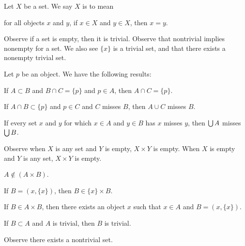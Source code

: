 \documentclass{article}
\begin{document}
\begin{definition}\label{zfmisc1:defn10:trivial}
Let $X$ be a set. We say $X$ is  to mean
\begin{defn}
\item for all objects $x$ and $y$, if $x\in X$ and $y\in X$, then $x=y$.
\end{defn}
\end{definition}

Observe if a set is empty, then it is trivial. Observe that nontrivial
implies nonempty for a set. We also see $\{x\}$ is a trivial set, and
that there exists a nonempty trivial set.

Let $p$ be an object. We have the following results:
\begin{thm}
\item\label{zfmisc1:124} If $A\subset B$ and $B\cap C=\{p\}$ and $p\in A$,
  then $A\cap C=\{p\}$.
\item\label{zfmisc1:125} If $A\cap B\subset\{p\}$ and $p\in C$ and $C$
  misses $B$, then $A\cup C$ misses $B$.
\item\label{zfmisc1:126} If every set $x$ and $y$ for which $x\in A$ and
  $y\in B$ has $x$ misses $y$, then $\bigcup A$ misses $\bigcup B$. 
\end{thm}

Observe when $X$ is any set and $Y$ is empty, $X\times Y$ is empty.
When $X$ is empty and $Y$ is any set, $X\times Y$ is empty.

\begin{thm}
\item\label{zfmisc1:127} $A\notin(A\times B)$.
\item\label{zfmisc1:128} If $B=(x,\{x\})$, then $B\in\{x\}\times B$.
\item\label{zfmisc1:129} If $B\in A\times B$, then there exists an object $x$
  such that $x\in A$ and $B=(x,\{x\})$.
\item\label{zfmisc1:130} If $B\subset A$ and $A$ is trivial, then $B$ is trivial.
\end{thm}

Observe there exists a nontrivial set.
\end{document}
